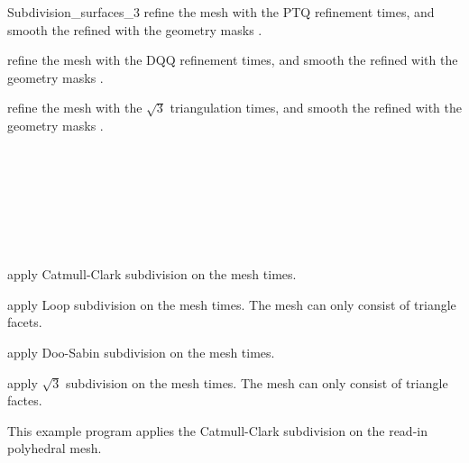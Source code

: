 \begin{ccRefClass}{Subdivision_surfaces_3}
{refine the mesh  with the PTQ refinement 
 times, and smooth the refined  with the geometry 
masks .}

{refine the mesh  with the DQQ refinement 
 times, and smooth the refined  with the geometry 
masks .}

{refine the mesh  with the $\sqrt{3}$ triangulation 
 times, and smooth the refined  with the geometry 
masks .}

\ccSeeAlso

\\
\\
\\
\\
\\
\\


\ccThree{}{}{}

{apply Catmull-Clark subdivision on the mesh   times.}

{apply Loop subdivision on the mesh   times. 
The mesh  can only consist of triangle facets.}

{apply Doo-Sabin subdivision on the mesh   times.}

{apply $\sqrt{3}$ subdivision on the mesh   times.
The mesh  can only consist of triangle factes.}

\ccExample

This example program applies the Catmull-Clark subdivision on the
read-in polyhedral mesh.


\end{ccRefClass}

\ccRefPageEnd
